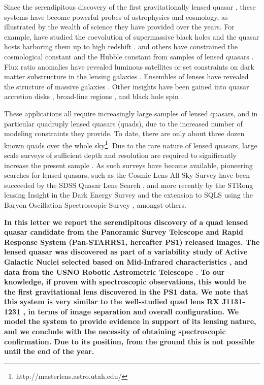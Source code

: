 \documentclass[manuscript]{aastex}
\begin{document}
Since the serendipitous discovery of the first gravitationally lensed quasar \citep{wal79}, these systems have become powerful probes of astrophysics and cosmology, as illustrated by the wealth of science they have provided over the years. For example, \citet{peng06,din17} have studied the coevolution of supermassive black holes and the quasar hosts harboring them up to high redshift \citep{cla02,tre10}. \citet{ogu12,bon17} and others have constrained the cosmological constant and the Hubble constant from samples of lensed quasars \citep[see recent review by][]{Tre16}. Flux ratio anomalies have revealed luminous satellites or set constraints on dark matter substructure in the lensing galaxies \citep[e.g.,][]{chiba05,mck07,fad12}. Ensembles of lenses have revealed the structure of massive galaxies \citep[e.g.,][]{koc00,ogu14}. Other insights have been gained into quasar accretion disks \citep[e.g.,][]{dai10}, broad-line regions \citep[e.g.,][]{slu12}, and black hole spin \citep{reis14}.

These applications all require increasingly large samples of lensed quasars, and in particular quadruply lensed quasars (quads), due to the increased number of modeling constraints they provide. To date, there are only about three dozen known quads over the whole sky\footnote{http://masterlens.astro.utah.edu/}. Due to the rare nature of lensed quasars, large scale surveys of sufficient depth and resolution are required to significantly increase the present sample \citep{ogu10}. As such surveys have become available, pioneering searches for lensed quasars, such as the Cosmic Lens All Sky Survey \citep[CLASS;][]{mye03} have been succeeded by the SDSS Quasar Lens Search \citep[SQLS;][]{ogu06}, and more recently by the STRong lensing Insight in the Dark Energy Survey \citep[STRIDES;][]{agn15} and the extension to SQLS using the Baryon Oscillation Spectroscopic Survey \citep[BQLS;][]{more16}, amongst others.

{\bf In this letter we report the serendipitous discovery of a quad lensed quasar candidate from the Panoramic Survey Telescope and Rapid Response System (Pan-STARRS1, hereafter PS1) released images. The lensed quasar was discovered as part of a variability study of Active Galactic Nuclei selected based on Mid-Infrared characteristics \citep{sec01}, and data from the USNO Robotic Astrometric Telescope \citep[URAT;][]{zac15}. To our knowledge, if proven with spectroscopic observations, this would be the first gravitational lens discovered in the PS1 data. We note that this system is very similar to the well-studied quad lens RX J1131-1231 \citep{slu03}, in terms of image separation and overall configuration. We model the system to provide evidence in support of its lensing nature, and we conclude with the necessity of obtaining spectroscopic confirmation. Due to its position, from the ground this is not possible until the end of the year.}
\end{document}

